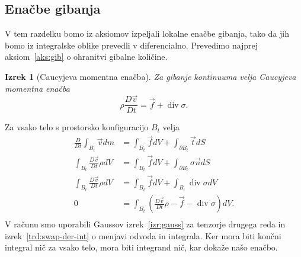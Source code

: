 \documentclass[a4paper,twoside]{article}
\theoremstyle{definition} %
\theoremstyle{plain} %
\newtheorem{izrek}[definicija]{Izrek}
\numberwithin{equation}{section}
\renewcommand{\div}{\operatorname{div}}
\newcommand{\DD}[2]{\ensuremath{\frac{D #1}{D #2}}}
\newcommand{\DDt}[1]{\DD{#1}{t}}
\newcommand{\vv}{\vec{v}}
\newcommand{\vt}{\vec{t}}
\newcommand{\vn}{\vec{n}}
\newcommand{\vf}{\vec{f}}
\newcommand{\ts}{\sigma}
\begin{document}
\subsection{Enačbe gibanja}
V tem razdelku bomo iz aksiomov izpeljali lokalne enačbe gibanja, tako da jih
bomo iz integralske oblike prevedli v diferencialno.
Prevedimo najprej aksiom~\ref{aks:gib} o ohranitvi gibalne količine.
\begin{izrek}[Caucyjeva momentna enačba]
  Za gibanje kontinuuma velja Caucyjeva momentna enačba
  \begin{equation}
    \rho \DDt{\vv} = \vf + \div \sigma.
    \label{eq:cauchy-moment}
  \end{equation}
\end{izrek}
\proof
Za vsako telo s prostorsko konfiguracijo $B_t$ velja
\begin{align*}
  \DDt{} \int_{B_t} \vv dm &= \int_{B_t} \vf dV + \int_{\partial {B_t}} \vt dS \\
  \int_{B_t} \DDt{\vv}\rho dV &= \int_{B_t} \vf dV + \int_{\partial {B_t}} \ts \vn dS \\
  \int_{B_t} \DDt{\vv}\rho dV &= \int_{B_t} \vf dV + \int_{B_t} \div \ts dV \\
  0 &= \int_{B_t}\left(\DDt{\vv}\rho - \vf - \div \ts\right) dV. \\
\end{align*}
V računu smo uporabili Gaussov izrek~\ref{izr:gauss} za tenzorje drugega reda in
izrek~\ref{trd:swap-der-int} o menjavi odvoda in integrala. Ker mora biti končni
integral nič za vsako telo, mora biti integrand nič, kar dokaže našo enačbo.
\endproof
\end{document}
